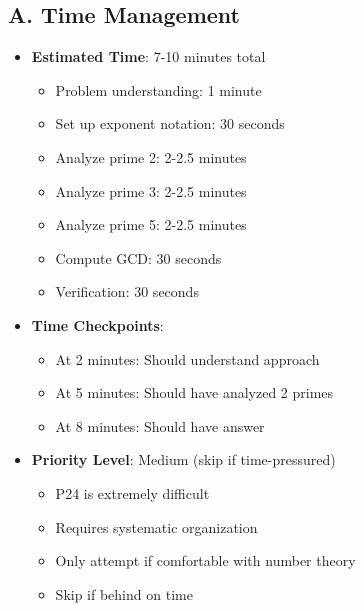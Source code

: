 \documentclass[12pt]{article}
\begin{document}
\begin{competitionbox}
\subsection*{A. Time Management}
\begin{itemize}[leftmargin=*]
    \item \textbf{Estimated Time}: 7-10 minutes total
    \begin{itemize}
        \item Problem understanding: 1 minute
        \item Set up exponent notation: 30 seconds
        \item Analyze prime 2: 2-2.5 minutes
        \item Analyze prime 3: 2-2.5 minutes
        \item Analyze prime 5: 2-2.5 minutes
        \item Compute GCD: 30 seconds
        \item Verification: 30 seconds
    \end{itemize}
    \item \textbf{Time Checkpoints}: 
    \begin{itemize}
        \item At 2 minutes: Should understand approach
        \item At 5 minutes: Should have analyzed 2 primes
        \item At 8 minutes: Should have answer
    \end{itemize}
    \item \textbf{Priority Level}: Medium (skip if time-pressured)
    \begin{itemize}
        \item P24 is extremely difficult
        \item Requires systematic organization
        \item Only attempt if comfortable with number theory
        \item Skip if behind on time
    \end{itemize}
\end{itemize}


\end{competitionbox}
\end{document}
